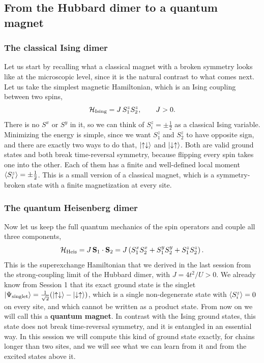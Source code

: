 \documentclass[lecture_notes.tex]{subfiles}
\begin{document}
\subsection{From the Hubbard dimer to a quantum magnet}
\label{sec:setup}
\subsubsection{The classical Ising dimer}
Let us start by recalling what a classical magnet with a broken symmetry looks like at the
microscopic level, since it is the natural contrast to what comes next. Let us take the simplest
magnetic Hamiltonian, which is an Ising coupling between two spins,
\begin{equation}
  \mathcal{H}_{\mathrm{Ising}} = J\, S_1^z S_2^z, \qquad J>0.
  \label{eq:isingdimer}
\end{equation}
There is no $S^x$ or $S^y$ in it, so we can think of $S_i^z=\pm\tfrac12$ as a classical Ising
variable. Minimizing the energy is simple, since we want $S_1^z$ and $S_2^z$ to have opposite sign,
and there are exactly two ways to do that, $\ket{\uparrow\downarrow}$ and $\ket{\downarrow\uparrow}$. Both are valid ground
states and both break time-reversal symmetry, because flipping every spin takes one into the other.
Each of them has a finite and well-defined local moment $\expval{S_i^z}=\pm\tfrac12$. This is a
small version of a classical magnet, which is a symmetry-broken state with a finite magnetization at
every site.

\subsubsection{The quantum Heisenberg dimer}
Now let us keep the full quantum mechanics of the spin operators and couple all three components,
\begin{equation}
  \mathcal{H}_{\mathrm{Heis}} = J\, \vb S_1\cdot\vb S_2 = J\left(S_1^xS_2^x + S_1^yS_2^y + S_1^zS_2^z\right).
  \label{eq:heisdimer}
\end{equation}
This is the superexchange Hamiltonian that we derived in the last session from the strong-coupling
limit of the Hubbard dimer, with $J=4t^2/U>0$. We already know from Session 1 that its exact ground
state is the singlet $\ket{\Psi_{\mathrm{singlet}}}=\tfrac{1}{\sqrt2}(\ket{\uparrow\downarrow}-\ket{\downarrow\uparrow})$,
which is a single non-degenerate state with $\expval{S_i^z}=0$ on every site, and which cannot be
written as a product state. From now on we will call this a \textbf{quantum magnet}. In
contrast with the Ising ground states, this state does not break time-reversal symmetry, and it is
entangled in an essential way. In this session we will compute this kind of ground state exactly,
for chains longer than two sites, and we will see what we can learn from it and from the excited
states above it.
\end{document}
